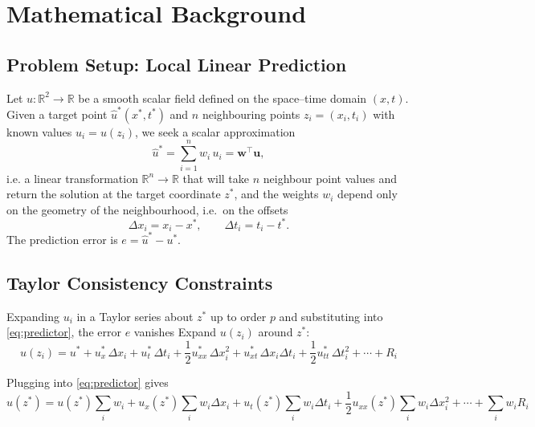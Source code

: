\documentclass[12pt, a4paper, twoside]{report}
\theoremstyle{plain}
\theoremstyle{definition}
\newcommand{\ux}{u^*}           %
\newcommand{\uhat}{\hat{u}^*}   %
\newcommand{\dxi}{\Delta x_i}
\newcommand{\dti}{\Delta t_i}
\newcommand{\bw}{\mathbf{w}}
\newcommand{\bu}{\mathbf{u}}
\newcommand{\R}{\mathbb{R}}
\begin{document}
\chapter{Mathematical Background}
\label{chap:theory}

\section{Problem Setup: Local Linear Prediction}
\label{sec:setup}

Let $u : \R^2 \to \R$ be a smooth scalar field defined on the
space--time domain $(x,t)$.
Given a target point $\hat{u}^* (x^*, t^*)$ and $n$ neighbouring
points $z_i = (x_i, t_i)$ with known values $u_i = u(z_i)$, we
seek a scalar approximation
\begin{equation}
    \uhat = \sum_{i=1}^{n} w_i\, u_i = \bw^\top \bu, 
    \label{eq:predictor}
\end{equation}
i.e. a linear transformation $\R^n \to \R$ that will take $n$ neighbour point values and return the solution at the target coordinate $z^*$, and the weights $w_i$ depend only on the geometry of the
neighbourhood, i.e.\ on the offsets
\begin{equation}
    \dxi = x_i - x^*, \qquad \dti = t_i - t^*.
\end{equation}
The prediction error is $e = \uhat - \ux$.

\section{Taylor Consistency Constraints}

Expanding $u_i$ in a Taylor series about $z^*$ up to order $p$
and substituting into \eqref{eq:predictor}, the error $e$ vanishes
Expand $u(z_i)$ around $z^*$:
\begin{equation}
u(z_i)=u^* + u_x^*\,\Delta x_i + u_t^*\,\Delta t_i
+\frac{1}{2}u_{xx}^*\,\Delta x_i^2 + u_{xt}^*\,\Delta x_i\Delta t_i
+\frac{1}{2}u_{tt}^*\,\Delta t_i^2 + \cdots+R_i
\end{equation}

Plugging into \eqref{eq:predictor} gives
\begin{equation*}
    \hat u(z^*) =
u(z^*)\sum_i w_i
+ u_x(z^*)\sum_i w_i\Delta x_i
+ u_t(z^*)\sum_i w_i\Delta t_i
+ \frac{1}{2}u_{xx}(z^*)\sum_i w_i\Delta x_i^2 + \cdots+\sum_i w_i R_i \label{eq: taylor_exp}
\end{equation*}
\end{document}
